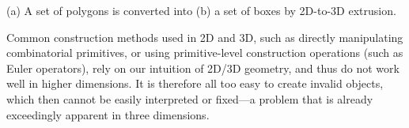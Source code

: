{
\caption[A set of polygons is converted into a set of boxes by 2D-to-3D extrusion.]{(a) A set of polygons is converted into (b) a set of boxes by 2D-to-3D extrusion.}
\label{fig:extrusion-sum-en}
}
Common construction methods used in 2D and 3D, such as directly manipulating combinatorial primitives, or using primitive-level construction operations (such as Euler operators), rely on our intuition of 2D/3D geometry, and thus do not work well in higher dimensions.
It is therefore all too easy to create invalid objects, which then cannot be easily interpreted or fixed---a problem that is already exceedingly apparent in three dimensions.

